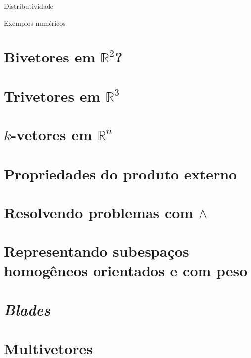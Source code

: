 \documentclass[
  letterpaper,
  DIV=11,
  numbers=noendperiod]{scrreprt}
\begin{document}
Distributividade

Exemplos numéricos

\hypertarget{bivetores-em-mathbbr2}{%
\section{\texorpdfstring{Bivetores em
$\mathbb{R}^2$?}{Bivetores em ?}}\label{bivetores-em-mathbbr2}}

\hypertarget{trivetores-em-mathbbr3}{%
\section{\texorpdfstring{Trivetores em
$\mathbb{R}^3$}{Trivetores em }}\label{trivetores-em-mathbbr3}}

\hypertarget{k-vetores-em-mathbbrn}{%
\section{\texorpdfstring{$k$-vetores em
$\mathbb{R}^n$}{-vetores em }}\label{k-vetores-em-mathbbrn}}

\hypertarget{propriedades-do-produto-externo}{%
\section{Propriedades do produto
externo}\label{propriedades-do-produto-externo}}

\hypertarget{resolvendo-problemas-com-wedge}{%
\section{\texorpdfstring{Resolvendo problemas com
$\wedge$}{Resolvendo problemas com }}\label{resolvendo-problemas-com-wedge}}

\hypertarget{representando-subespauxe7os-homoguxeaneos-orientados-e-com-peso}{%
\section{Representando subespaços homogêneos orientados e com
peso}\label{representando-subespauxe7os-homoguxeaneos-orientados-e-com-peso}}

\hypertarget{blades}{%
\section{\texorpdfstring{\emph{Blades}}{Blades}}\label{blades}}

\hypertarget{multivetores}{%
\section{Multivetores}\label{multivetores}}
\end{document}
